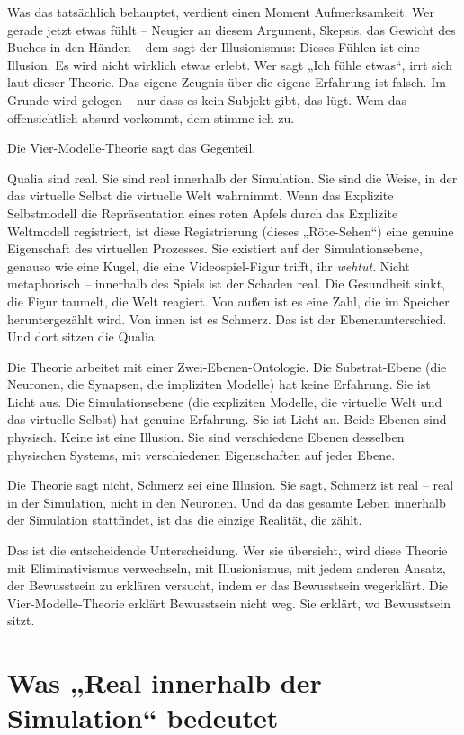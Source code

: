 \documentclass[11pt, twoside, openright]{book}
\begin{document}
Was das tatsächlich behauptet, verdient einen Moment Aufmerksamkeit. Wer gerade jetzt etwas fühlt -- Neugier an diesem Argument, Skepsis, das Gewicht des Buches in den Händen -- dem sagt der Illusionismus: Dieses Fühlen ist eine Illusion. Es wird nicht wirklich etwas erlebt. Wer sagt „Ich fühle etwas“, irrt sich laut dieser Theorie. Das eigene Zeugnis über die eigene Erfahrung ist falsch. Im Grunde wird gelogen -- nur dass es kein Subjekt gibt, das lügt. Wem das offensichtlich absurd vorkommt, dem stimme ich zu.

Die Vier-Modelle-Theorie sagt das Gegenteil.

Qualia sind real. Sie sind real innerhalb der Simulation. Sie sind die Weise, in der das virtuelle Selbst die virtuelle Welt wahrnimmt. Wenn das Explizite Selbstmodell die Repräsentation eines roten Apfels durch das Explizite Weltmodell registriert, ist diese Registrierung (dieses „Röte-Sehen“) eine genuine Eigenschaft des virtuellen Prozesses. Sie existiert auf der Simulationsebene, genauso wie eine Kugel, die eine Videospiel-Figur trifft, ihr \textit{wehtut}. Nicht metaphorisch -- innerhalb des Spiels ist der Schaden real. Die Gesundheit sinkt, die Figur taumelt, die Welt reagiert. Von außen ist es eine Zahl, die im Speicher heruntergezählt wird. Von innen ist es Schmerz. Das ist der Ebenenunterschied. Und dort sitzen die Qualia.

Die Theorie arbeitet mit einer Zwei-Ebenen-Ontologie. Die Substrat-Ebene (die Neuronen, die Synapsen, die impliziten Modelle) hat keine Erfahrung. Sie ist Licht aus. Die Simulationsebene (die expliziten Modelle, die virtuelle Welt und das virtuelle Selbst) hat genuine Erfahrung. Sie ist Licht an. Beide Ebenen sind physisch. Keine ist eine Illusion. Sie sind verschiedene Ebenen desselben physischen Systems, mit verschiedenen Eigenschaften auf jeder Ebene.

Die Theorie sagt nicht, Schmerz sei eine Illusion. Sie sagt, Schmerz ist real -- real in der Simulation, nicht in den Neuronen. Und da das gesamte Leben innerhalb der Simulation stattfindet, ist das die einzige Realität, die zählt.

Das ist die entscheidende Unterscheidung. Wer sie übersieht, wird diese Theorie mit Eliminativismus verwechseln, mit Illusionismus, mit jedem anderen Ansatz, der Bewusstsein zu erklären versucht, indem er das Bewusstsein wegerklärt. Die Vier-Modelle-Theorie erklärt Bewusstsein nicht weg. Sie erklärt, wo Bewusstsein sitzt.

\section*{Was „Real innerhalb der Simulation“ bedeutet}
\end{document}

